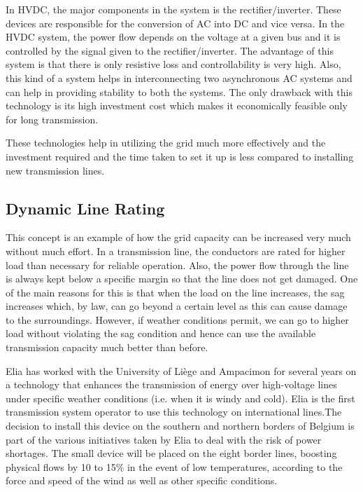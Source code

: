 \documentclass[11pt,a4paper]{article}
\begin{document}
In HVDC, the major components in the system is the rectifier/inverter. These devices are responsible for the conversion of AC into DC and vice versa. In the HVDC system, the power flow depends on the voltage at a given bus and it is controlled by the signal given to the rectifier/inverter. The advantage of this system is that there is only resistive loss and controllability is very high. Also, this kind of a system helps in interconnecting two asynchronous AC systems and can help in providing stability to both the systems. The only drawback with this technology is its high investment cost which makes it economically feasible only for long transmission.

These technologies help in utilizing the grid much more effectively and the investment required and the time taken to set it up is less compared to installing new transmission lines.

\subsection{Dynamic Line Rating}
This concept is an example of how the grid capacity can be increased very much without much effort. In a transmission line, the conductors are rated for higher load than necessary for reliable operation. Also, the power flow through the line is always kept below a specific margin so that the line does not get damaged. One of the main reasons for this is that when the load on the line increases, the sag increases which, by law, can go beyond a certain level as this can cause damage to the surroundings. However, if weather conditions permit, we can go to higher load without violating the sag condition and hence can use the available transmission capacity much better than before.

Elia has worked with the University of Liège and Ampacimon for several years on a technology that enhances the transmission of energy over high-voltage lines under specific weather conditions (i.e. when it is windy and cold). Elia is the first transmission system operator to use this technology on international lines.The decision to install this device on the southern and northern borders of Belgium is part of the various initiatives taken by Elia to deal with the risk of power shortages. The small device will be placed on the eight border lines, boosting physical flows by 10 to 15\% in the event of low temperatures, according to the force and speed of the wind as well as other specific conditions\cite{elia:2014}.
\end{document}

